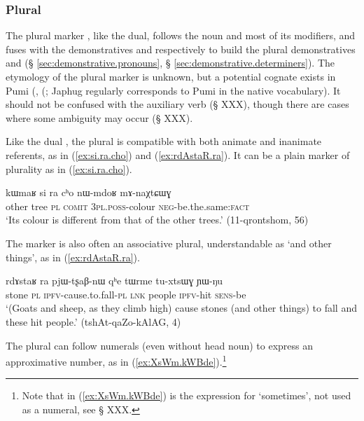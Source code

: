 \subsubsection{Plural} \label{sec:plural.determiners}
The plural marker , like the dual, follows the noun and most of its modifiers, and fuses with the demonstratives  and  respectively to build the plural demonstratives  and  (§ \ref{sec:demonstrative.pronouns}, § \ref{sec:demonstrative.determiners}). The etymology of the plural marker  is unknown, but a potential cognate exists in Pumi (, (\citealt[135]{daudey14grammar}; Japhug  regularly corresponds to Pumi  in the native vocabulary). It should not be confused with the auxiliary verb  (§ XXX), though there are cases where some ambiguity may occur (§ XXX).

Like the dual , the plural  is compatible with both animate and inanimate referents, as in (\ref{ex:si.ra.cho}) and (\ref{ex:rdAstaR.ra}). It can be a plain marker of plurality as in (\ref{ex:si.ra.cho}).

\begin{exe}
\ex \label{ex:si.ra.cho}
\gll kɯmaʁ si ra cʰo nɯ-mdoʁ mɤ-naχtɕɯɣ \\
other tree \textsc{pl} \textsc{comit} \textsc{3pl}.\textsc{poss}-colour \textsc{neg}-be.the.same:\textsc{fact} \\
\glt `Its colour is different from that of the other trees.' (11-qrontshom, 56)
\end{exe} 

The marker  is also often an associative plural, understandable as `and other things', as in (\ref{ex:rdAstaR.ra}).

\begin{exe}
\ex \label{ex:rdAstaR.ra}
\gll rdɤstaʁ ra pjɯ-tʂaβ-nɯ qʰe tɯrme tu-xtsɯɣ ɲɯ-ŋu \\
stone \textsc{pl} \textsc{ipfv}-cause.to.fall-\textsc{pl} \textsc{lnk} people \textsc{ipfv}-hit \textsc{sens}-be \\
\glt `(Goats and sheep, as they climb high) cause stones (and other things) to fall and these hit people.' (tshAt-qaZo-kAlAG, 4)
\end{exe} 

The plural can follow numerals (even without head noun) to express an approximative number, as in (\ref{ex:XsWm.kWBde}).\footnote{Note that in (\ref{ex:XsWm.kWBde})  is the expression for `sometimes', not used as a numeral, see § XXX.} 

